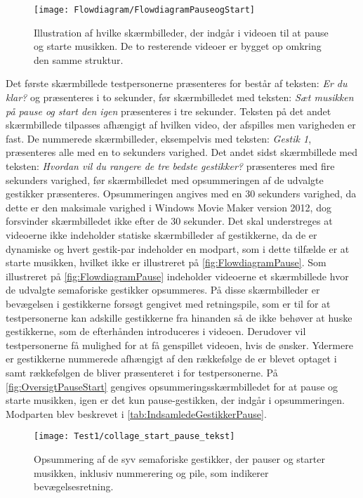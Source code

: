 %
\begin{figure}[H]
	\centering
	\texttt{[image: Flowdiagram/FlowdiagramPauseogStart]}
	\caption{Illustration af hvilke skærmbilleder, der indgår i videoen til at pause og starte musikken. De to resterende videoer er bygget op omkring den samme struktur.}
	\label{fig:FlowdiagramPause}
\end{figure}
\noindent
%
Det første skærmbillede testpersonerne præsenteres for består af teksten: \textit{Er du klar?} og præsenteres i to sekunder, før skærmbilledet med teksten: \textit{Sæt musikken på pause og start den igen} præsenteres i tre sekunder. Teksten på det andet skærmbillede tilpasses afhængigt af hvilken video, der afspilles men varigheden er fast. De nummerede skærmbilleder, eksempelvis med teksten: \textit{Gestik 1}, præsenteres alle med en to sekunders varighed. Det andet sidst skærmbillede med teksten: \textit{Hvordan vil du rangere de tre bedste gestikker?} præsenteres med fire sekunders varighed, før skærmbilledet med opsummeringen af de udvalgte gestikker præsenteres. Opsummeringen angives med en 30 sekunders varighed, da dette er den maksimale varighed i Windows Movie Maker version 2012, dog forsvinder skærmbilledet ikke efter de 30 sekunder. Det skal understreges at videoerne ikke indeholder statiske skærmbilleder af gestikkerne, da de er dynamiske og hvert gestik-par indeholder en modpart, som i dette tilfælde er at starte musikken, hvilket ikke er illustreret på \autoref{fig:FlowdiagramPause}.\blankline
%
Som illustreret på \autoref{fig:FlowdiagramPause} indeholder videoerne et skærmbillede hvor de udvalgte semaforiske gestikker opsummeres. På disse skærmbilleder er bevægelsen i gestikkerne forsøgt gengivet med retningspile, som er til for at testpersonerne kan adskille gestikkerne fra hinanden så de ikke behøver at huske gestikkerne, som de efterhånden introduceres i videoen. Derudover vil testpersonerne få mulighed for at få genspillet videoen, hvis de ønsker. Ydermere er gestikkerne nummerede afhængigt af den rækkefølge de er blevet optaget i samt rækkefølgen de bliver præsenteret i for testpersonerne. På \autoref{fig:OversigtPauseStart} gengives opsummeringsskærmbilledet for at pause og starte musikken, igen er det kun pause-gestikken, der indgår i opsummeringen. Modparten blev beskrevet i \autoref{tab:IndsamledeGestikkerPause}.  
%
\begin{figure}[H]
	\centering
	\texttt{[image: Test1/collage\_start\_pause\_tekst]}
	\caption{Opsummering af de syv semaforiske gestikker, der pauser og starter musikken, inklusiv nummerering og pile, som indikerer bevægelsesretning.}
	\label{fig:OversigtPauseStart}
\end{figure}
